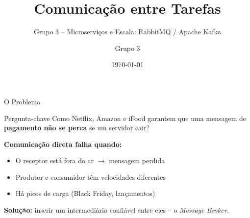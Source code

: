 \documentclass[10pt,aspectratio=169]{beamer}
\title[IPC: Message Brokers]{Comunicação entre Tarefas}
\subtitle{Grupo 3 -- Microserviços e Escala: RabbitMQ / Apache Kafka}
\author[Grupo 3]{Grupo 3}
\institute[IFSC]{IFSC -- Campus São José \\ Sistemas Operacionais}
\date{\today}
\begin{document}
\begin{frame}
    \titlepage
\end{frame}

\begin{frame}{O Problema}
    \begin{block}{Pergunta-chave}
        Como Netflix, Amazon e iFood garantem que uma mensagem de
        \textbf{pagamento não se perca} se um servidor cair?
    \end{block}

    \vspace{0.2cm}
    \textbf{Comunicação direta falha quando:}
    \begin{itemize}
        \item O receptor está fora do ar $\rightarrow$ mensagem perdida
        \item Produtor e consumidor têm velocidades diferentes
        \item Há picos de carga (Black Friday, lançamentos)
    \end{itemize}

    \vspace{0.2cm}
    \textbf{Solução:} inserir um intermediário confiável entre eles -- o \emph{Message Broker}.
\end{frame}
\end{document}
